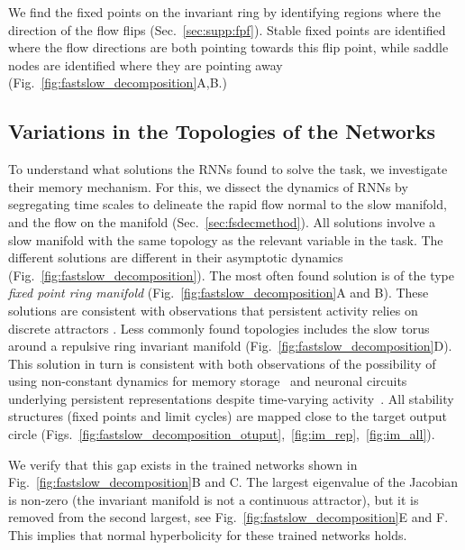 \documentclass{article} %
\newcounter{ct}
\theoremstyle{definition}
\theoremstyle{remark}
\begin{document}
We find the fixed points on the invariant ring by identifying regions where the direction of the flow flips (Sec.~\ref{sec:supp:fpf}).
Stable fixed points are identified where the flow directions are both pointing towards this flip point,
while saddle nodes are identified where they are pointing away (Fig.~\ref{fig:fastslow_decomposition}A,B.) %



\subsection{Variations in the Topologies of the Networks}\label{sec:topologies}
To understand what solutions the RNNs found to solve the task, we investigate their memory mechanism.
For this, we dissect the dynamics of RNNs by segregating time scales to delineate the rapid flow normal to the slow manifold, and the flow on the manifold (Sec.~\ref{sec:fsdecmethod}).
All solutions involve a slow manifold with the same topology as the relevant variable in the task.
The different solutions are different in their asymptotic dynamics (Fig.~\ref{fig:fastslow_decomposition}).
The most often found solution is of the type \emph{fixed point ring manifold} (Fig.~\ref{fig:fastslow_decomposition}A and B).
These solutions are consistent with observations that persistent activity relies on discrete attractors \citep{brody2003, inagaki2019}.
Less commonly found topologies includes the slow torus around a repulsive ring invariant manifold (Fig.~\ref{fig:fastslow_decomposition}D).
This solution in turn is consistent with both observations of the possibility of using non-constant dynamics for memory storage~\citep{hirsch1995computing, Park2023a} and neuronal circuits underlying persistent representations despite time-varying activity~\citep{druckmann2012neuronal}.
All stability structures (fixed points and limit cycles) are mapped close to the target output circle (Figs.~\ref{fig:fastslow_decomposition_otuput},~\ref{fig:im_rep},~\ref{fig:im_all}).

We verify that this gap exists in the trained networks shown in Fig.~\ref{fig:fastslow_decomposition}B and C.
The largest  eigenvalue of the Jacobian is non-zero (the invariant manifold is not a continuous attractor), but it is removed from the second largest, see Fig.~\ref{fig:fastslow_decomposition}E and F.
This implies that normal hyperbolicity for these trained networks holds.
\end{document}
